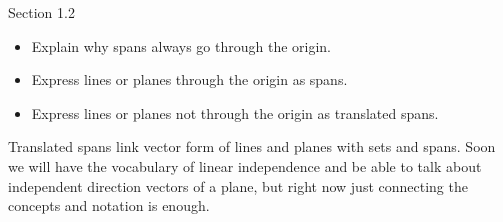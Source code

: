 	\begin{bookonly}\begin{center}\doublegrid\end{center}\end{bookonly}


\begin{lesson}

	Section 1.2

	\begin{itemize}
		\item Explain why spans always go through the origin.
		\item Express lines or planes through the origin as spans.
		\item Express lines or planes not through the origin as translated spans.
	\end{itemize}

	Translated spans link vector form of lines and planes with sets and spans.
	Soon we will have the vocabulary of linear independence and be able to
	talk about independent direction vectors of a plane, but right now just connecting
	the concepts and notation is enough.

\end{lesson}

